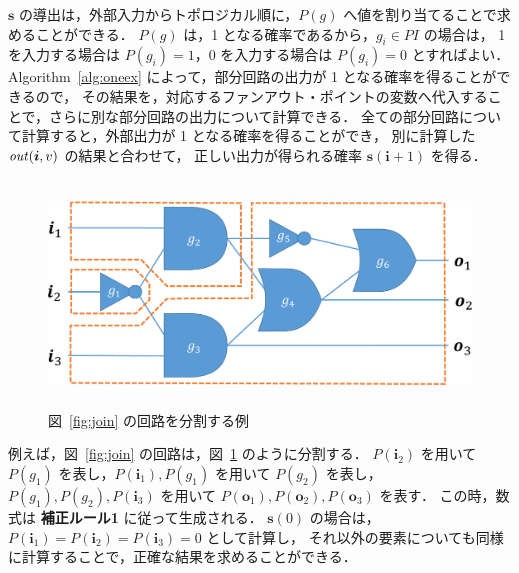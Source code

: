
${\bm s}$ の導出は，外部入力からトポロジカル順に，$P(g)$ へ値を割り当てることで求めることができる．
$P(g)$ は，1 となる確率であるから，$g_i \in PI$ の場合は，
1 を入力する場合は $P(g_i) = 1$，0 を入力する場合は $P(g_i) = 0$ とすればよい．
Algorithm~\ref{alg:oneex} によって，部分回路の出力が 1 となる確率を得ることができるので，
その結果を，対応するファンアウト・ポイントの変数へ代入することで，さらに別な部分回路の出力について計算できる．
全ての部分回路について計算すると，外部出力が 1 となる確率を得ることができ，
別に計算した ${\it out}({\bm i}, v)$ の結果と合わせて，
正しい出力が得られる確率 ${\bm s}({\bm i} + 1)$ を得る．

\begin{figure}[tbp]
  \begin{center}
    \includegraphics[height=60mm,clip]{img/fan-out-div.pdf}
  \end{center}
  \caption{図~\ref{fig:join} の回路を分割する例}
  \label{fig:fan-out-div}
\end{figure}
例えば，図~\ref{fig:join} の回路は，図~\ref{fig:fan-out-div} のように分割する．
$P({\bm i_2})$ を用いて $P(g_1)$ を表し，$P({\bm i_1}), P(g_1)$ を用いて $P(g_2)$ を表し，
$P(g_1), P(g_2), P({\bm i_3})$ を用いて $P({\bm o_1}), P({\bm o_2}), P({\bm o_3})$ を表す．
この時，数式は {\bf 補正ルール1} に従って生成される．
${\bm s}(0)$ の場合は，$P({\bm i_1}) = P({\bm i_2}) = P({\bm i_3}) = 0$ として計算し，
それ以外の要素についても同様に計算することで，正確な結果を求めることができる．
